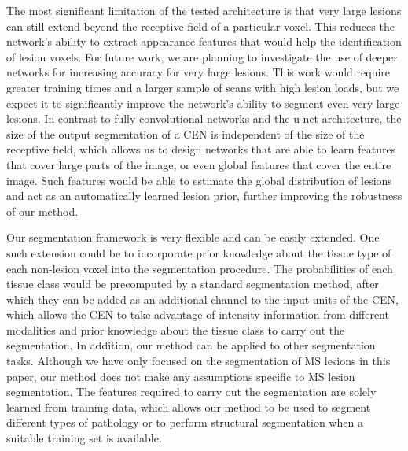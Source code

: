 The most significant limitation of the tested architecture is that very large
lesions can still extend beyond the receptive field of a particular voxel. This
reduces the network's ability to extract appearance features that would help the
identification of lesion voxels. For future work, we are planning to investigate
the use of deeper networks for increasing accuracy for very large lesions.
%
This work would require greater training times and a larger sample of scans with
high lesion loads, but we expect it to significantly improve the network's
ability to segment even very large lesions. In contrast to fully convolutional
networks and the u-net architecture, the size of the output segmentation of a
CEN is independent of the size of the receptive field, which allows us to design
networks that are able to learn features that cover large parts of the image, or
even global features that cover the entire image. Such features would be able to
estimate the global distribution of lesions and act as an automatically learned
lesion prior, further improving the robustness of our method.



Our segmentation framework is very flexible and can be easily extended. One such
extension could be to incorporate prior knowledge about the tissue type of each
non-lesion voxel into the segmentation procedure.
%
%
The probabilities of each tissue class would be precomputed by a standard
segmentation method, after which they can be added as an additional channel to the input units of the CEN, which allows the
CEN to take advantage of intensity information from different modalities and
prior knowledge about the tissue class to carry out the segmentation.
%
%
In addition, our method can be applied to other segmentation tasks. Although we
have only focused on the segmentation of MS lesions in this paper, our method
does not make any assumptions specific to MS lesion segmentation. The features
required to carry out the segmentation are solely learned from training data,
which allows our method to be used to segment different types of pathology or to
perform structural segmentation when a suitable training set is available.

